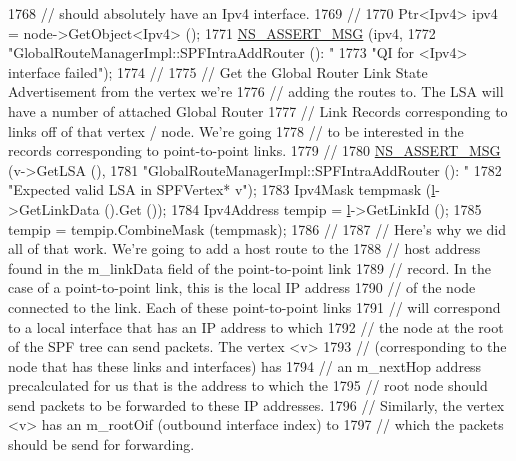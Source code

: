 \begin{DoxyCode}
1768 \textcolor{comment}{// should absolutely have an Ipv4 interface.}
1769 \textcolor{comment}{//}
1770           Ptr<Ipv4> ipv4 = node->GetObject<Ipv4> ();
1771           \hyperlink{assert_8h_aff5ece9066c74e681e74999856f08539}{NS\_ASSERT\_MSG} (ipv4, 
1772                          \textcolor{stringliteral}{"GlobalRouteManagerImpl::SPFIntraAddRouter (): "}
1773                          \textcolor{stringliteral}{"QI for <Ipv4> interface failed"});
1774 \textcolor{comment}{//}
1775 \textcolor{comment}{// Get the Global Router Link State Advertisement from the vertex we're}
1776 \textcolor{comment}{// adding the routes to.  The LSA will have a number of attached Global Router}
1777 \textcolor{comment}{// Link Records corresponding to links off of that vertex / node.  We're going}
1778 \textcolor{comment}{// to be interested in the records corresponding to point-to-point links.}
1779 \textcolor{comment}{//}
1780           \hyperlink{assert_8h_aff5ece9066c74e681e74999856f08539}{NS\_ASSERT\_MSG} (v->GetLSA (), 
1781                          \textcolor{stringliteral}{"GlobalRouteManagerImpl::SPFIntraAddRouter (): "}
1782                          \textcolor{stringliteral}{"Expected valid LSA in SPFVertex* v"});
1783           Ipv4Mask tempmask (\hyperlink{buildings__pathloss_8m_a5b54c0a045f179bcbbbc9abcb8b5cd4c}{l}->GetLinkData ().Get ());
1784           Ipv4Address tempip = \hyperlink{buildings__pathloss_8m_a5b54c0a045f179bcbbbc9abcb8b5cd4c}{l}->GetLinkId ();
1785           tempip = tempip.CombineMask (tempmask);
1786 \textcolor{comment}{//}
1787 \textcolor{comment}{// Here's why we did all of that work.  We're going to add a host route to the}
1788 \textcolor{comment}{// host address found in the m\_linkData field of the point-to-point link}
1789 \textcolor{comment}{// record.  In the case of a point-to-point link, this is the local IP address}
1790 \textcolor{comment}{// of the node connected to the link.  Each of these point-to-point links}
1791 \textcolor{comment}{// will correspond to a local interface that has an IP address to which}
1792 \textcolor{comment}{// the node at the root of the SPF tree can send packets.  The vertex <v> }
1793 \textcolor{comment}{// (corresponding to the node that has these links and interfaces) has }
1794 \textcolor{comment}{// an m\_nextHop address precalculated for us that is the address to which the}
1795 \textcolor{comment}{// root node should send packets to be forwarded to these IP addresses.}
1796 \textcolor{comment}{// Similarly, the vertex <v> has an m\_rootOif (outbound interface index) to}
1797 \textcolor{comment}{// which the packets should be send for forwarding.}

\end{DoxyCode}

